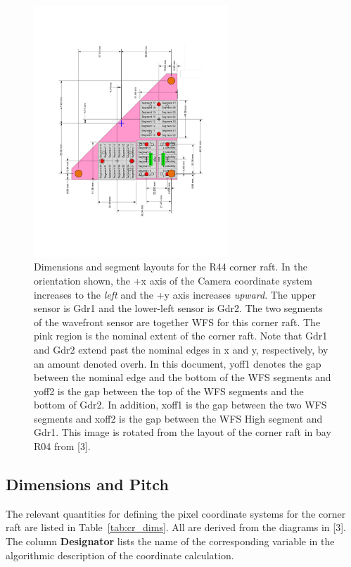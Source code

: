 \documentclass{article}[12pt]
\begin{document}
{\begin{figure}
\centering
    \includegraphics[width=0.65\textwidth]{CR_R44.pdf}
    \caption{Dimensions and segment layouts for the R44 corner raft.  In the orientation shown, the +x axis of the Camera coordinate system increases to the {\em left} and the +y axis increases {\em upward}.  The upper sensor is Gdr1 and the lower-left sensor is Gdr2.  The two segments of the wavefront sensor are together WFS for this corner raft.  The pink region is the nominal extent of the corner raft.  Note that Gdr1 and Gdr2 extend past the nominal edges in x and y, respectively, by an amount denoted overh.  In this document, yoff1 denotes the gap between the nominal edge and the bottom of the WFS segments and yoff2 is the gap between the top of the WFS segments and the bottom of Gdr2.  In addition, xoff1 is the gap between the two WFS segments and xoff2 is the gap between the WFS High segment and Gdr1. This image is rotated from the layout of the corner raft in bay R04 from [3].  }
    \label{fig:CRlayout}
\end{figure}

\subsection{Dimensions and Pitch}
The relevant quantities for defining the pixel coordinate systems for the corner raft are listed in Table~\ref{tab:cr_dims}.  All are derived from the diagrams in [3].  The column {\bf Designator} lists the name of the corresponding variable in the algorithmic description of the coordinate calculation.  

}
\end{document}
